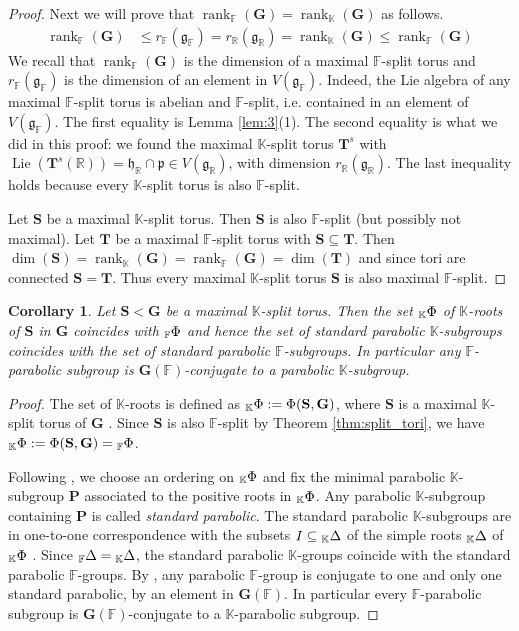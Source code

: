 \documentclass[12pt]{amsart}
\newcommand{\F}{\mathbb{F} }
\newcommand{\R}{\mathbb{R} }
\newcommand{\K}{\mathbb{K}}
\newcommand{\frakg}{\mathfrak{g}}
\newcommand{\frakp}{\mathfrak{p}}
\newcommand{\frakh}{\mathfrak{h}}
\newcommand{\bG}{\mathbf{G}}
\newcommand{\bT}{\mathbf{T}}
\newcommand{\bS}{\mathbf{S}}
\newcommand{\bP}{\mathbf{P}}
\newcommand{\KPhi}{\vphantom{\Phi}_{\K}\Phi}
\newcommand{\FPhi}{\vphantom{\Phi}_{\F}\Phi}
\newcommand{\KDelta}{\vphantom{\Delta}_{\K}\Delta}
\newcommand{\FDelta}{\vphantom{\Delta}_{\F}\Delta}
\numberwithin{equation}{section}
\newtheorem{corollary}[theorem]{Corollary}
\theoremstyle{remark} %
\begin{document}
\begin{proof}
	Next we will prove that $\operatorname{rank}_\F (\bG) = \operatorname{rank}_\K (\bG)$ as follows.
	\begin{align*}
		\operatorname{rank}_\F (\bG) &\leq r_\F (\frakg_\F) 
		= r_\R (\frakg_\R) = \operatorname{rank}_\K (\bG) \leq \operatorname{rank}_\F (\bG)
	\end{align*}
	We recall that $\operatorname{rank}_\F(\bG)$ is the dimension of a maximal $\F$-split torus and $r_\F(\frakg_\F)$ is the dimension of an element in $V(\frakg_\F)$. Indeed, the Lie algebra of any maximal $\F$-split torus is abelian and $\F$-split, i.e. contained in an element of $V(\frakg_\F)$. The first equality is Lemma \ref{lem:3}(1). The second equality is what we did in this proof: we found the maximal $\K$-split torus $\bT^s$ with $\operatorname{Lie}(\bT^s(\R)) = \frakh_\R\cap\frakp \in V(\frakg_\R)$, with dimension $r_\R(\frakg_\R)$. 
	The last inequality holds because every $\K$-split torus is also $\F$-split.
	
	Let $\bS$ be a maximal $\K$-split torus. Then $\bS$ is also $\F$-split (but possibly not maximal). Let $\bT$ be a maximal $\F$-split torus with $\bS \subseteq \bT$. Then $\dim(\bS) = \operatorname{rank}_\K(\bG) = \operatorname{rank}_\F(\bG) = \dim (\bT)$ and since tori are connected $\bS=\bT$. Thus every maximal $\K$-split torus $\bS$ is also maximal $\F$-split.
\end{proof}



 \begin{corollary}\label{cor:split_tori}
	Let $\bS < \bG$ be a maximal $\K$-split torus. Then the set $\KPhi$ of $\K$-roots of $\bS$ in $\bG$ coincides with $\FPhi$ and hence the set of standard parabolic $\K$-subgroups coincides with the set of standard parabolic $\F$-subgroups. In particular any $\F$-parabolic subgroup is $\bG(\F)$-conjugate to a parabolic $\K$-subgroup.
\end{corollary}



\begin{proof}
	The set of $\K$-roots is defined as $\KPhi := \Phi(\bS,\bG)$, where $\bS$ is a maximal $\K$-split torus of $\bG$ \cite[21.1]{Bor}. Since $\bS$ is also $\F$-split by Theorem \ref{thm:split_tori}, we have $\KPhi := \Phi(\bS,\bG) = \FPhi $. 
	
	Following \cite[21.11]{Bor}, we choose an ordering on $\KPhi$ and fix the minimal parabolic $\K$-subgroup $\bP$ associated to the positive roots in $\KPhi$. Any parabolic $\K$-subgroup containing $\bP$ is called \emph{standard parabolic}. The standard parabolic $\K$-subgroups are in one-to-one correspondence with the subsets $I \subseteq \KDelta$ of the simple roots $\KDelta$ of $\KPhi$ \cite[Proposition 21.12]{Bor}. Since $\FDelta = \KDelta$, the standard parabolic $\K$-groups coincide with the standard parabolic $\F$-groups. By \cite[Proposition 21.12]{Bor}, any parabolic $\F$-group is conjugate to one and only one standard parabolic, by an element in $\bG(\F)$. In particular every $\F$-parabolic subgroup is $\bG(\F)$-conjugate to a $\K$-parabolic subgroup.
\end{proof}
\end{document}
